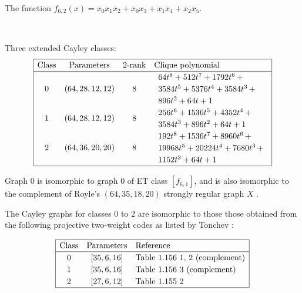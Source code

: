 \documentclass[12pt,a4paper]{article}
\begin{document}
The function
$f_{6,2}(x) = x_{0} x_{1} x_{2} + x_{0} x_{3} + x_{1} x_{4} + x_{2} x_{5}$.

~

Three extended Cayley classes:
\small{}
\begin{align*}
\def\arraystretch{1.2}
\begin{array}{|cccl|}
\hline
\text{Class} &
\text{Parameters} &
\text{2-rank} &
\text{Clique polynomial}
\\
\hline
0 &
(64, 28, 12, 12) &
8 &
\begin{array}{l}
64t^{8} + 512t^{7} + 1792t^{6}
\,+
\\
 3584t^{5} + 5376t^{4} + 3584t^{3}
\,+
\\
 896t^{2} + 64t + 1
\end{array}
\\
1 &
(64, 28, 12, 12) &
8 &
\begin{array}{l}
256t^{6} + 1536t^{5} + 4352t^{4}
\,+
\\
 3584t^{3} + 896t^{2} + 64t + 1
\end{array}
\\
2 &
(64, 36, 20, 20) &
8 &
\begin{array}{l}
192t^{8} + 1536t^{7} + 8960t^{6}
\,+
\\
 19968t^{5} + 20224t^{4} + 7680t^{3}
\,+
\\
 1152t^{2} + 64t + 1
\end{array}
\\
\hline
\end{array}
\end{align*}


Graph 0 is isomorphic to graph 0 of ET class $[f_{6,1}]$,
and is also isomorphic to the complement of Royle's $(64,35,18,20)$ strongly regular graph $X$
\cite{Roy08normal}.
%
%

The Cayley graphs for classes 0 to 2 are isomorphic to those those obtained from the following
projective two-weight
codes as listed by Tonchev \cite{Ton07codes}:

\begin{align*}
\def\arraystretch{1.2}
\begin{array}{|ccl|}
\hline
\text{Class} &
\text{Parameters} & \text{Reference}
\\
\hline
0 & [35,6,16] & \text{Table 1.156 1, 2 (complement)}
\\
1 & [35,6,16] & \text{Table 1.156 3 (complement)}
\\
2 & [27,6,12] & \text{Table 1.155 2 }
\\
\hline
\end{array}
\end{align*}
\end{document}
